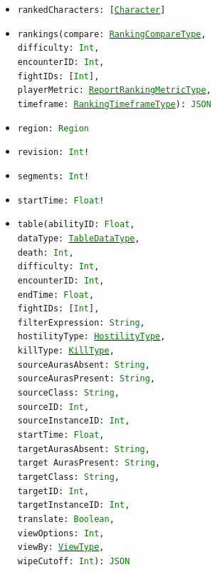 \documentclass[10pt, a4paper]{memoir}
\numberwithin{equation}{section}
\theoremstyle{plain}
\theoremstyle{defp}
\theoremstyle{dotless}
\theoremstyle{definition}
\theoremstyle{dotless}
\theoremstyle{dotless}
\theoremstyle{defp}
\theoremstyle{defp}
\theoremstyle{be}          %
\theoremstyle{defp}
\newcommand\ttt[1]{\texttt{#1}}
\newcommand\type[1]{\ttt{\textcolor{green}{#1}}}
\begin{document}
\begin{itemize}[noitemsep,topsep=1pt]
\begin{itemize}[itemsep=1pt,topsep=1pt]
		\item \ttt{rankedCharacters: [\hyperref[sec:Character]{\type{Character}}]}
		\item \ttt{rankings(compare: \hyperref[sec:RankingCompareType]{\type{RankingCompareType}}, \\difficulty: \type{Int}, \\encounterID: \type{Int}, \\fightIDs: [\type{Int}], \\playerMetric: \hyperref[sec:ReportRankingMetricType]{\type{ReportRankingMetricType}}, \\timeframe: \hyperref[sec:RankingTimeframeType]{\type{RankingTimeframeType}}): \type{JSON}}
		\item \ttt{region: \type{Region}}
		\item \ttt{revision: \type{Int}!}
		\item \ttt{segments: \type{Int}!}
		\item \ttt{startTime: \type{Float}!}
		\item \ttt{table(abilityID: \type{Float}, \\dataType: \hyperref[sec:TableDataType]{\type{TableDataType}}, \\death: \type{Int}, \\difficulty: \type{Int}, \\encounterID: \type{Int}, \\endTime: \type{Float}, \\fightIDs: [\type{Int}], \\filterExpression: \type{String}, \\hostilityType: \hyperref[sec:HostilityType]{\type{HostilityType}}, \\killType: \hyperref[sec:KillType]{\type{KillType}}, \\sourceAurasAbsent: \type{String}, \\sourceAurasPresent: \type{String}, \\sourceClass: \type{String}, \\sourceID: \type{Int}, \\sourceInstanceID: \type{Int}, \\startTime: \type{Float}, \\targetAurasAbsent: \type{String}, \\target AurasPresent: \type{String}, \\targetClass: \type{String}, \\targetID: \type{Int}, \\targetInstanceID: \type{Int}, \\translate: \type{Boolean}, \\viewOptions: \type{Int}, \\viewBy: \hyperref[sec:ViewType]{\type{ViewType}}, \\wipeCutoff: \type{Int}): \type{JSON}}

\end{itemize}
\end{itemize}
\end{document}
